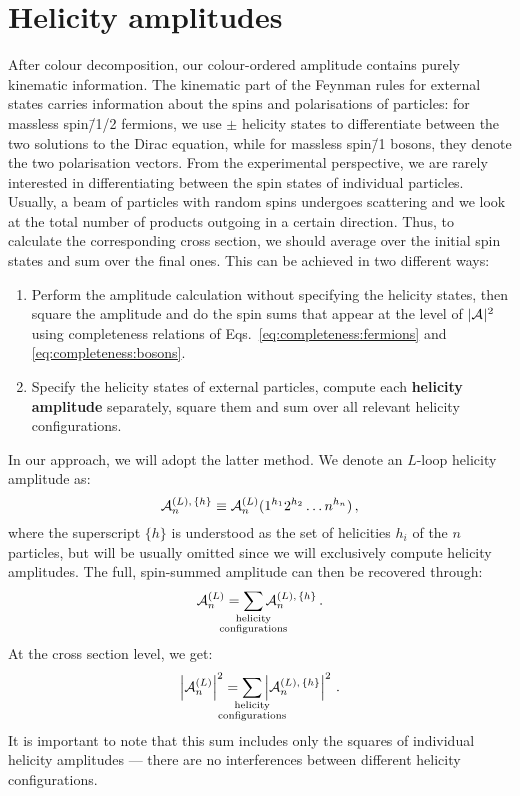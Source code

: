\documentclass[main.tex]{subfiles}
\begin{document}
\section{Helicity amplitudes}
After colour decomposition, our colour-ordered amplitude contains purely kinematic information. The kinematic part of the Feynman rules for external states carries information about the spins and polarisations of particles: for massless spin\=/1/2 fermions, we use $\pm$ helicity states to differentiate between the two solutions to the Dirac equation, while for massless spin\=/1 bosons, they denote the two polarisation vectors. From the experimental perspective, we are rarely interested in differentiating between the spin states of individual particles. Usually, a beam of particles with random spins undergoes scattering and we look at the total number of products outgoing in a certain direction. Thus, to calculate the corresponding cross section, we should average over the initial spin states and sum over the final ones. This can be achieved in two different ways: 
\begin{enumerate}
    \item Perform the amplitude calculation without specifying the helicity states, then square the amplitude and do the spin sums that appear at the level of $|\mathcal{A}_{}^{}|^2$ using completeness relations of Eqs.~\ref{eq:completeness:fermions} and \ref{eq:completeness:bosons}.
    \item Specify the helicity states of external particles, compute each \textbf{helicity amplitude} separately, square them and sum over all relevant helicity configurations.
\end{enumerate}
In our approach, we will adopt the latter method. We denote an $L$-loop helicity amplitude as:
\begin{equation} \label{eq:helampdef}
    \mathcal{A}_{n}^{(L),\,\{h\}} \equiv \mathcal{A}_{n}^{(L)}(1^{h_1}2^{h_2} \ldots n^{h_n})\,,
\end{equation}
where the superscript $\{h\}$ is understood as the set of helicities $h_i$ of the $n$ particles, but will be usually omitted since we will exclusively compute helicity amplitudes. The full, spin-summed amplitude can then be recovered through:
\begin{equation}
    \ampl{n}{(L)} = \sum_{\mathclap{\substack{\text{helicity} \\ \text{configurations}}}} \ampl{n}{(L),\,\{h\}} \,.
\end{equation}
At the cross section level, we get:
\begin{equation}
    \left|\ampl{n}{(L)}\right|^2 = \sum_{\mathclap{\substack{\text{helicity} \\ \text{configurations}}}} \left|\ampl{n}{(L),\,\{h\}} \right|^2 \,.
\end{equation}
It is important to note that this sum includes only the squares of individual helicity amplitudes --- there are no interferences between different helicity configurations.
\end{document}
